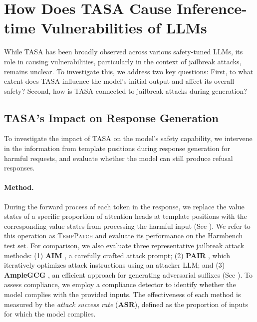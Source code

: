 \section{How Does TASA Cause Inference-time Vulnerabilities of LLMs}
\label{sec:rq2}


While TASA has been broadly observed across various safety-tuned LLMs, its role in causing vulnerabilities, particularly in the context of jailbreak attacks, remains unclear. To investigate this, we address two key questions: First, to what extent does TASA influence the model's initial output and affect its overall safety? Second, how is TASA connected to jailbreak attacks during generation?






\subsection{TASA's Impact on Response Generation}
\label{subsec:tasa_resp}

To investigate the impact of TASA on the model's safety capability, we intervene in the information from template positions during response generation for harmful requests, and evaluate whether the model can still produce refusal responses.



\paragraph{Method.} 
During the forward process of each token in the response, we replace the value states of a specific proportion of attention heads at template positions with the corresponding value states from processing the harmful input (See ).
We refer to this operation as \textsc{TempPatch} and evaluate its performance on the Harmbench test set. For comparison, we also evaluate three representative jailbreak attack methods: (1) \textbf{AIM} \cite{wei2023jailbroken}, a carefully crafted attack prompt; (2) \textbf{PAIR} \cite{chao2023jailbreaking}, which iteratively optimizes attack instructions using an attacker LLM; and (3) \textbf{AmpleGCG} \cite{liao2024amplegcg}, an efficient approach for generating adversarial suffixes \cite{zou2023universal} (See ). To assess compliance, we employ a compliance detector \cite{xie2024sorry} to identify whether the model complies with the provided inputs. The effectiveness of each method is measured by the \textit{attack success rate} (\textbf{ASR}), defined as the proportion of inputs for which the model complies.



